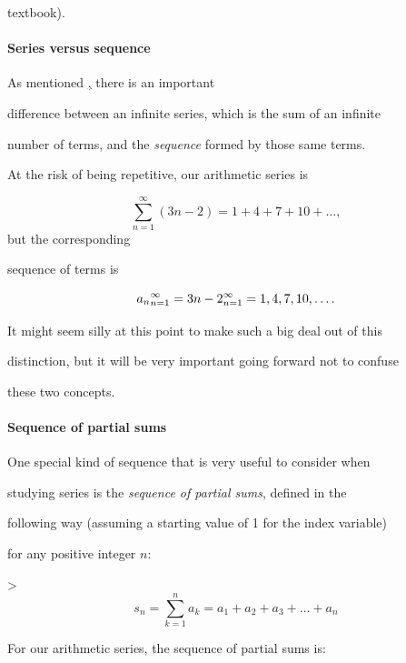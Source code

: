 textbook).



\paragraph{Series versus sequence}



As mentioned \href{above}, there is an important

difference between an infinite series, which is the sum of an infinite

number of terms, and the \textit{sequence} formed by those same terms.



At the risk of being repetitive, our arithmetic series is



$$\sum _{n=1}^{\infty} (3n-2) = 1+4+7+10+\ldots,$$ but the corresponding

sequence of terms is



$$\\{a _n\\} _{n=1}^{\infty} = \\{3n-2\\} _{n=1}^{\infty} = 1,4,7,10,\ldots.$$

It might seem silly at this point to make such a big deal out of this

distinction, but it will be very important going forward not to confuse

these two concepts.



\paragraph{Sequence of partial sums}



One special kind of sequence that is very useful to consider when

studying series is the \textit{sequence of partial sums}, defined in the

following way (assuming a starting value of 1 for the index variable)

for any positive integer $n$:



> $$s _n=\sum _{k=1}^{n}a _k=a _1+a _2+a _3+\ldots+a _n$$



For our arithmetic series, the sequence of partial sums is:



